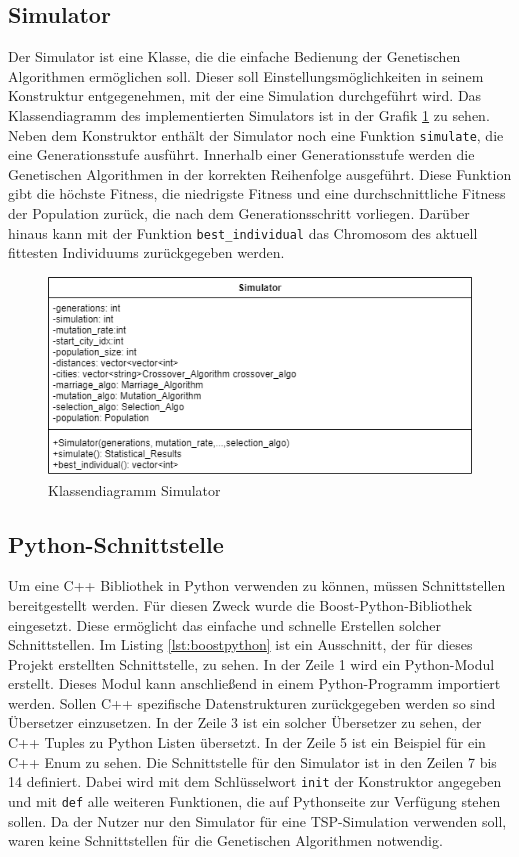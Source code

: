\subsection{Simulator}
Der Simulator ist eine Klasse, die die einfache Bedienung der Genetischen Algorithmen ermöglichen soll. Dieser soll Einstellungsmöglichkeiten in seinem Konstruktur entgegenehmen, mit der eine Simulation durchgeführt wird. Das Klassendiagramm des implementierten Simulators ist in der Grafik \ref{fig:simulator} zu sehen. Neben dem Konstruktor enthält der Simulator noch eine Funktion \texttt{simulate}, die eine Generationsstufe ausführt. Innerhalb einer Generationsstufe werden die Genetischen Algorithmen in der korrekten Reihenfolge ausgeführt. Diese Funktion gibt die höchste Fitness, die niedrigste Fitness und eine durchschnittliche Fitness der Population zurück, die nach dem Generationsschritt vorliegen. Darüber hinaus kann mit der Funktion \texttt{best\_individual} das Chromosom des aktuell fittesten Individuums zurückgegeben werden.

\begin{figure}[H]
\centering
\includegraphics[width=1\textwidth]{img/Vortrag/simulator.png}
\caption{Klassendiagramm Simulator}
\label{fig:simulator}
\end{figure}

\subsection{Python-Schnittstelle}
Um eine C++ Bibliothek in Python verwenden zu können, müssen Schnittstellen bereitgestellt werden. Für diesen Zweck wurde die Boost-Python-Bibliothek eingesetzt. Diese ermöglicht das einfache und schnelle Erstellen solcher Schnittstellen. Im Listing \ref{lst:boostpython} ist ein Ausschnitt, der für dieses Projekt erstellten Schnittstelle, zu sehen. In der Zeile 1 wird ein Python-Modul erstellt. Dieses Modul kann anschließend in einem Python-Programm importiert werden. Sollen C++ spezifische Datenstrukturen zurückgegeben werden so sind Übersetzer einzusetzen. In der Zeile 3 ist ein solcher Übersetzer zu sehen, der C++ Tuples zu Python Listen übersetzt. In der Zeile 5 ist ein Beispiel für ein C++ Enum zu sehen. Die Schnittstelle für den Simulator ist in den Zeilen 7 bis 14 definiert. Dabei wird mit dem Schlüsselwort \texttt{init} der Konstruktor angegeben und mit \texttt{def} alle weiteren Funktionen, die auf Pythonseite zur Verfügung stehen sollen. Da der Nutzer nur den Simulator für eine TSP-Simulation verwenden soll, waren keine Schnittstellen für die Genetischen Algorithmen notwendig.

